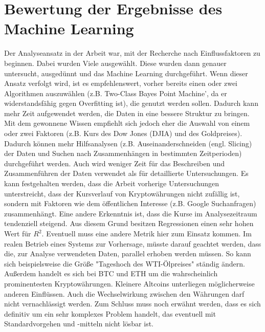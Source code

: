 \section{Bewertung der Ergebnisse des Machine Learning}\label{sec:BewertungML}
Der Analyseansatz in der Arbeit war, mit der Recherche nach Einflussfaktoren zu beginnen. Dabei wurden Viele ausgewählt. Diese wurden dann genauer untersucht, ausgedünnt und das Machine Learning durchgeführt. Wenn dieser Ansatz verfolgt wird, ist es empfehlenswert, vorher bereits einen oder zwei Algorithmen auszuwählen (z.B. Two-Class Bayes Point Machine', da er widerstandsfähig gegen Overfitting ist), die genutzt werden sollen. Dadurch kann mehr Zeit aufgewendet werden, die Daten in eine bessere Struktur zu bringen.\newline
Mit dem gewonnene Wissen empfiehlt sich jedoch eher die Auswahl von einem oder zwei Faktoren (z.B. Kurs des Dow Jones (DJIA) und des Goldpreises). Dadurch können mehr Hilfsanalysen (z.B. Auseinanderschneiden (engl. Slicing) der Daten und Suchen nach Zusammenhängen in bestimmten Zeitperioden) durchgeführt werden. Auch wird weniger Zeit für das Beschreiben und Zusammenführen der Daten verwendet als für detaillierte Untersuchungen.\newline
Es kann festgehalten werden, dass die Arbeit vorherige Untersuchungen unterstreicht, dass der Kursverlauf von Kryptowährungen nicht zufällig ist, sondern mit Faktoren wie dem öffentlichen Interesse (z.B. Google Suchanfragen) zusammenhängt.\newline
Eine andere Erkenntnis ist, dass die Kurse im Analysezeitraum tendenziell steigend. Aus diesem Grund besitzen Regressionen einen sehr hohen Wert für $ R^2 $. Eventuell muss eine andere Metrik hier zum Einsatz kommen.\newline
Im realen Betrieb eines Systems zur Vorhersage, müsste darauf geachtet werden, dass die, zur Analyse verwendeten Daten, parallel erhoben werden müssen. So kann sich beispielsweise die Größe "Tageshoch des WTI-Ölpreises" ständig ändern. Außerdem handelt es sich bei BTC und ETH um die wahrscheinlich prominentesten Kryptowährungen. Kleinere Altcoins unterliegen möglicherweise anderen Einflüssen. Auch die Wechselwirkung zwischen den Währungen darf nicht vernachlässigt werden.\newline
Zum Schluss muss noch erwähnt werden, dass es sich definitiv um ein sehr komplexes Problem handelt, das eventuell mit Standardvorgehen und -mitteln nicht lösbar ist.